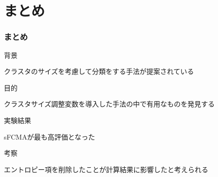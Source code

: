 \documentclass[13pt,dvipdfmx]{beamer}
\begin{document}
\section{まとめ}
\begin{frame}\frametitle{まとめ}
  \begin{block}{背景}
   \begin{center}
    クラスタのサイズを考慮して分類をする手法が提案されている
   \end{center}
  \end{block}
 \begin{block}{目的}
  \begin{center}
   クラスタサイズ調整変数を導入した手法の中で有用なものを発見する
  \end{center}
 \end{block}
  \begin{block}{実験結果}
   \begin{center}
    sFCMAが最も高評価となった
   \end{center}
  \end{block}
 \begin{block}{考察}
  \begin{center}
   エントロピー項を削除したことが計算結果に影響したと考えられる
  \end{center}
 \end{block}
\end{frame}
\end{document}
